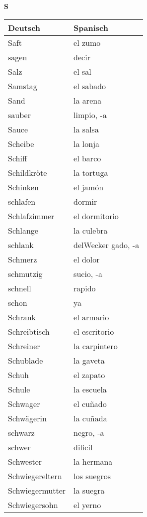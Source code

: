 \begin{flushright}\begin{Huge}\textbf{S}\end{Huge}\end{flushright}

\begin{longtable}{p{} p{}} 
\textbf{Deutsch}     & \textbf{Spanisch}                                       \\ \hline
\hline
\endhead %
Saft & el zumo\\
sagen & decir \\
Salz & el sal\\
Samstag & el sabado\\
Sand & la arena\\
sauber & limpio, -a\\
Sauce & la salsa\\
Scheibe & la lonja\\
Schiff & el barco\\
Schildkröte & la tortuga\\
Schinken & el jamón\\
schlafen & dormir\\
Schlafzimmer & el dormitorio\\
Schlange & la culebra\\
schlank & delWecker
gado, -a\\
Schmerz & el dolor\\
schmutzig & sucio, -a\\
schnell & rapido\\
schon & ya\\
Schrank & el armario\\
Schreibtisch & el escritorio\\
Schreiner & la carpintero\\
Schublade & la gaveta\\
Schuh & el zapato\\
Schule & la escuela\\
Schwager & el cuñado\\
Schwägerin & la cuñada\\
schwarz & negro, -a\\
schwer & dificil\\
Schwester & la hermana\\
Schwiegereltern & los suegros\\
Schwiegermutter & la suegra\\
Schwiegersohn & el yerno\\

\end{longtable}
